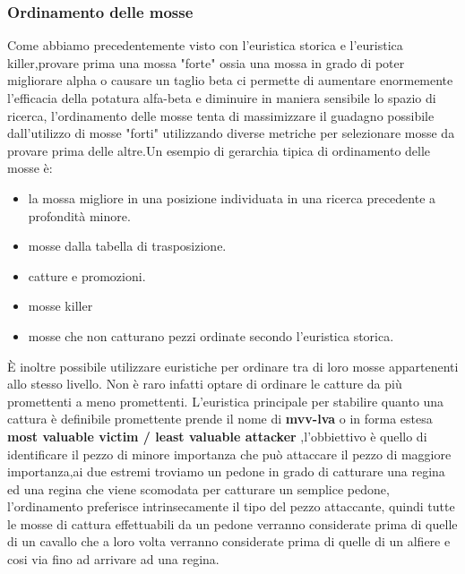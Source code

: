 \subsubsection{Ordinamento delle mosse}
Come abbiamo precedentemente visto con l'euristica storica e l'euristica killer,provare prima una mossa "forte" ossia una mossa in grado di 
poter migliorare alpha o causare un taglio beta ci permette di aumentare enormemente l'efficacia della potatura alfa-beta e diminuire in maniera 
sensibile lo spazio di ricerca, l'ordinamento delle mosse tenta di massimizzare il guadagno possibile dall'utilizzo di mosse "forti" utilizzando 
diverse metriche per selezionare mosse da provare prima delle altre.Un esempio di gerarchia tipica di ordinamento delle mosse è:
\begin{itemize}
\item la mossa migliore in una posizione individuata in una ricerca precedente a profondità minore.
\item mosse dalla tabella  di trasposizione.
\item catture e promozioni.
\item mosse killer
\item mosse che non catturano pezzi ordinate secondo l'euristica storica.
\end{itemize} 
È inoltre possibile utilizzare euristiche per ordinare tra di loro mosse appartenenti allo stesso livello. Non è raro infatti optare di ordinare le catture da più promettenti a meno promettenti.
L'euristica principale per stabilire quanto una cattura è definibile promettente prende il nome di \textbf{mvv-lva} o in forma estesa \textbf{most valuable victim / least valuable attacker} ,l'obbiettivo è quello di identificare 
il pezzo di minore importanza che può attaccare il pezzo di maggiore importanza,ai due estremi troviamo un pedone in grado di catturare una regina ed una regina che viene scomodata per catturare un semplice pedone,
l'ordinamento preferisce intrinsecamente il tipo del pezzo attaccante, quindi tutte le mosse di cattura effettuabili da un pedone verranno considerate prima di quelle di un cavallo che a loro volta verranno considerate
prima di quelle di un alfiere e cosi via fino ad arrivare ad una regina. 


